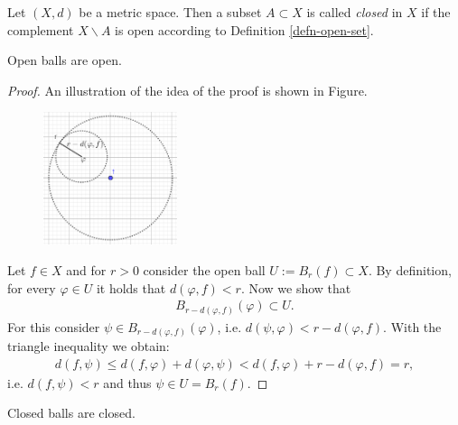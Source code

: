 \begin{defn}
	Let $(X, d)$ be a metric space. Then a subset $A\subset X$ is called \textit{closed} in $X$ if the complement $X\backslash A$ is open according to Definition \ref{defn-open-set}. 
\end{defn}

\begin{theorem}\label{open-balls-open}
	Open balls are open. 
\end{theorem}

\begin{proof}
	An illustration of the idea of the proof is shown in Figure. 
	\begin{figure}[h!]
		\centering
		\includegraphics[width=0.35\textwidth]{Figures/open-balls-open.png}
	\end{figure}
	
	Let $f\in X$ and for $r > 0$ consider the open ball $U:= B_{r}(f) \subset X$. By definition, for every $\varphi \in U$ it holds that $d\left(\varphi, f\right) < r$. Now we show that 
	\begin{align}
		B_{r-d\left(\varphi, f\right)}(\varphi) \subset U.
	\end{align}
	For this consider $\psi\in B_{r-d\left(\varphi, f\right)}(\varphi)$, i.e. $d(\psi, \varphi) < r - d(\varphi, f)$. With the triangle inequality we obtain: 
	\begin{align}
		d(f, \psi) \leq d(f, \varphi) + d(\varphi, \psi) < d(f, \varphi) + r - d(\varphi, f) = r,  		
	\end{align}
	i.e. $d(f, \psi) < r$ and thus $\psi\in U = B_{r}(f)$.
\end{proof}


\begin{theorem}\label{thrm:closed_balls_open}
	Closed balls are closed.
\end{theorem}

